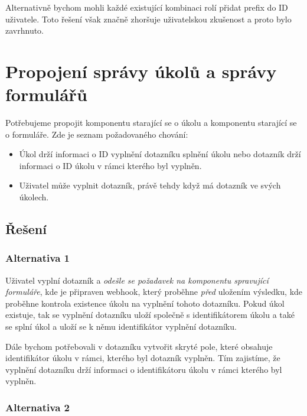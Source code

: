 Alternativně bychom mohli každé existující kombinaci rolí přidat prefix do ID uživatele.
Toto řešení však značně zhoršuje uživatelskou zkušenost a proto bylo zavrhnuto.

\section{Propojení správy úkolů a správy formulářů}\label{sec:propojeni-spravy-ukolu-a-spravy-formularu}


Potřebujeme propojit komponentu starající se o úkolu a komponentu starající se o formuláře.
Zde je seznam požadovaného chování:

\begin{itemize}
    \item
    Úkol drží informaci o ID vyplnění dotazníku splnění úkolu nebo dotazník drží informaci o ID úkolu v rámci kterého byl vyplněn.
    \item
    Uživatel může vyplnit dotazník, právě tehdy když má dotazník ve svých úkolech.
\end{itemize}

\subsection{Řešení}\label{subsec:reseni}

\subsubsection{Alternativa 1}\label{subsubsec:alternativa-1}

Uživatel vyplní dotazník a \emph{odešle se požadavek na komponentu spravující formuláře}, kde je připraven webhook, který proběhne \emph{před} uložením výsledku, kde proběhne kontrola existence úkolu na vyplnění tohoto dotazníku.
Pokud úkol existuje, tak se vyplnění dotazníku uloží společně s identifikátorem úkolu a také se splní úkol a uloží se k němu identifikátor vyplnění dotazníku.

Dále bychom potřebovali v dotazníku vytvořit skryté pole, které obsahuje identifikátor úkolu v rámci, kterého byl dotazník vyplněn.
Tím zajistíme, že vyplnění dotazníku drží informaci o identifikátoru úkolu v rámci kterého byl vyplněn.

\subsubsection{Alternativa 2}\label{subsubsec:alternativa-2}

